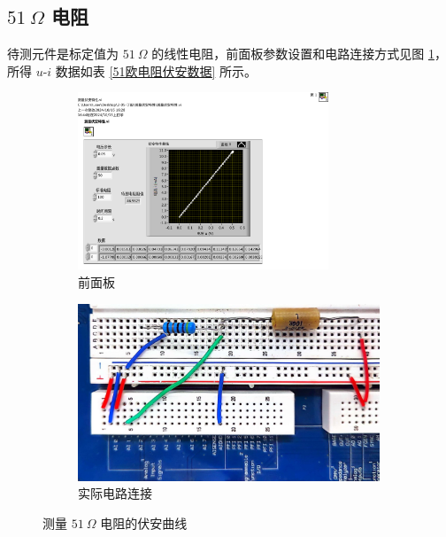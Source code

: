 \documentclass[UTF8]{article}
\theoremstyle{MyLineTheoremStyle} %
\theoremstyle{MyBlockTheoremStyle} %
\theoremstyle{MySubsubsectionStyle} %
\begin{document}
\subsection{$51 \ \Omega$ 电阻}
待测元件是标定值为 $51 \ \Omega$ 的线性电阻，前面板参数设置和电路连接方式见图 \ref{测量51欧电阻的伏安曲线}，所得 $u$-$i$ 数据如表 \ref{51欧电阻伏安数据} 所示。

\begin{figure}[H]\centering
\begin{subfigure}[b]{0.45\columnwidth}\centering
    \includegraphics[height=150pt]{assets/测量伏安曲线__50欧电阻.pdf}
    \caption{前面板}
\end{subfigure}\hfill
\begin{subfigure}[b]{0.55\columnwidth}\centering
    \includegraphics[height=150pt]{assets/测量伏安曲线__50欧电阻.jpg}
    \caption{实际电路连接}
\end{subfigure}
\caption{测量 $51 \ \Omega$ 电阻的伏安曲线}
\label{测量51欧电阻的伏安曲线}
\end{figure}
\end{document}
